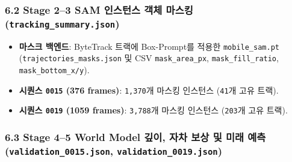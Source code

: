 \documentclass[10.5pt,a4paper]{article}
\begin{document}
\subsubsection{6.2 Stage 2--3 SAM 인스턴스 객체 마스킹 (\texttt{tracking\_\allowbreak{}summary.\allowbreak{}json})}
\begin{itemize}[leftmargin=1.5em,itemsep=2pt]
\item \textbf{마스크 백엔드}: ByteTrack 트랙에 Box-Prompt를 적용한 \texttt{mobile\_\allowbreak{}sam.\allowbreak{}pt} (\texttt{trajectories\_\allowbreak{}masks.\allowbreak{}json} 및 CSV \texttt{mask\_\allowbreak{}area\_\allowbreak{}px}, \texttt{mask\_\allowbreak{}fill\_\allowbreak{}ratio}, \texttt{mask\_\allowbreak{}bottom\_\allowbreak{}x/\allowbreak{}y}).
\item \textbf{시퀀스 \texttt{0015} (376 frames)}: \texttt{1,\allowbreak{}370}개 마스킹 인스턴스 (\texttt{41}개 고유 트랙).
\item \textbf{시퀀스 \texttt{0019} (1059 frames)}: \texttt{3,\allowbreak{}788}개 마스킹 인스턴스 (\texttt{203}개 고유 트랙).
\end{itemize}

\subsubsection{6.3 Stage 4--5 World Model 깊이, 자차 보상 및 미래 예측 (\texttt{validation\_\allowbreak{}0015.\allowbreak{}json}, \texttt{validation\_\allowbreak{}0019.\allowbreak{}json})}
\end{document}
